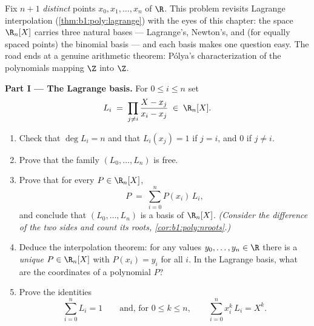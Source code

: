 \begin{problem}\label{pb:b1:vspaces:1}
Fix $n + 1$ \emph{distinct} points $x_0, x_1, \dots, x_n$ of $\R$.
This problem revisits Lagrange interpolation
(\cref{thm:b1:poly:lagrange}) with the eyes of this chapter: the
space $\R_n[X]$ carries three natural bases --- Lagrange's,
Newton's, and (for equally spaced points) the binomial basis ---
and each basis makes one question easy. The road ends at a genuine
arithmetic theorem: P\'olya's characterization of the polynomials
mapping $\Z$ into $\Z$.

\medskip
\noindent\textbf{Part I --- The Lagrange basis.} For $0 \leq i
\leq n$ set
\[
L_i \;=\; \prod_{j \neq i} \frac{X - x_j}{x_i - x_j} \;\in\;
\R_n[X].
\]
\begin{enumerate}
  \item Check that $\deg L_i = n$ and that $L_i(x_j) = 1$ if $j =
        i$, and $0$ if $j \neq i$.
  \item Prove that the family $(L_0, \dots, L_n)$ is free.
  \item Prove that for every $P \in \R_n[X]$,
        \[
        P \;=\; \sum_{i=0}^{n} P(x_i)\, L_i ,
        \]
        and conclude that $(L_0, \dots, L_n)$ is a basis of
        $\R_n[X]$. \emph{(Consider the difference of the two sides
        and count its roots, \cref{cor:b1:poly:nroots}.)}
  \item Deduce the interpolation theorem: for any values $y_0,
        \dots, y_n \in \R$ there is a \emph{unique} $P \in
        \R_n[X]$ with $P(x_i) = y_i$ for all $i$. In the Lagrange
        basis, what are the coordinates of a polynomial $P$?
  \item Prove the identities
        \[
        \sum_{i=0}^{n} L_i = 1
        \qquad\text{and, for } 0 \leq k \leq n,\qquad
        \sum_{i=0}^{n} x_i^{k}\, L_i = X^{k} .
        \]
\end{enumerate}


\end{problem}
